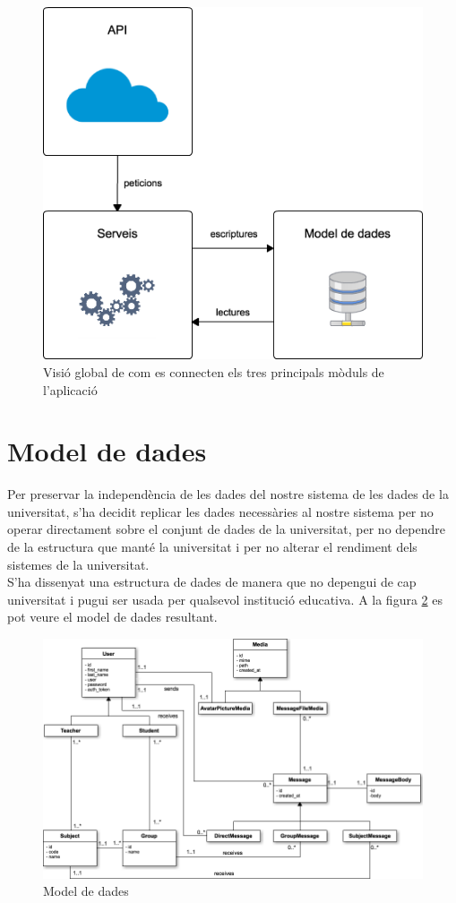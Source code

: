 \begin{figure}[h!]
    \includegraphics[scale=0.7]{img/estructura.png}
    \centering
    \caption{Visió global de com es connecten els tres principals mòduls de l'aplicació}
    \label{fig:estructura}
\end{figure}

\section{Model de dades}
Per preservar la independència de les dades del nostre sistema de les dades de la universitat, s'ha decidit replicar les dades necessàries al nostre sistema per no operar directament sobre el conjunt de dades de la universitat, per no dependre de la estructura que manté la universitat i per no alterar el rendiment dels sistemes de la universitat.\\

S'ha dissenyat una estructura de dades de manera que no depengui de cap universitat i pugui ser usada per qualsevol institució educativa. A la figura \ref{fig:model} es pot veure el model de dades resultant. \\

\begin{figure}[here]
    \includegraphics[scale=0.5]{img/uml.png}
    \centering
    \caption{Model de dades}
    \label{fig:model}
\end{figure}

